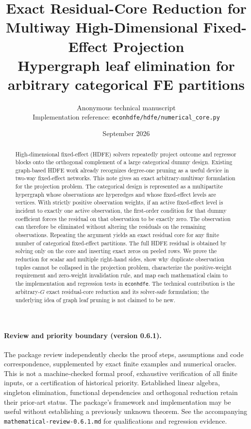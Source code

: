 \documentclass[11pt]{article}
\title{\textbf{Exact Residual-Core Reduction for Multiway High-Dimensional Fixed-Effect Projection}\\
\large Hypergraph leaf elimination for arbitrary categorical FE partitions}
\author{Anonymous technical manuscript\\[2pt]\small Implementation reference: \texttt{econhdfe/hdfe/numerical\_core.py}}
\date{September 2026}
\theoremstyle{definition}
\newcommand{\1}{\mathbf{1}}
\begin{document}
\maketitle

\begin{abstract}
High-dimensional fixed-effect (HDFE) solvers repeatedly project outcome and regressor blocks onto the orthogonal complement of a large categorical dummy design. Existing graph-based HDFE work already recognizes degree-one pruning as a useful device in two-way fixed-effect networks. This note gives an exact arbitrary-multiway formulation for the projection problem. The categorical design is represented as a multipartite hypergraph whose observations are hyperedges and whose fixed-effect levels are vertices. With strictly positive observation weights, if an active fixed-effect level is incident to exactly one active observation, the first-order condition for that dummy coefficient forces the residual on that observation to be exactly zero. The observation can therefore be eliminated without altering the residuals on the remaining observations. Repeating the argument yields an exact residual core for any finite number of categorical fixed-effect partitions. The full HDFE residual is obtained by solving only on the core and inserting exact zeros on peeled rows. We prove the reduction for scalar and multiple right-hand sides, show why duplicate observation tuples cannot be collapsed in the projection problem, characterize the positive-weight requirement and zero-weight invalidation rule, and map each mathematical claim to the implementation and regression tests in \texttt{econhdfe}. The technical contribution is the arbitrary-$G$ exact residual-core reduction and its solver-safe formulation; the underlying idea of graph leaf pruning is not claimed to be new.
\end{abstract}

\paragraph{Review and priority boundary (version 0.6.1).}
The package review independently checks the proof steps, assumptions and code
correspondence, supplemented by exact finite examples and numerical oracles.
This is not a machine-checked formal proof, exhaustive verification of all finite
inputs, or a certification of historical priority. Established linear algebra,
singleton elimination, functional dependencies and orthogonal reduction retain
their prior-art status. The package's framework and implementation may be useful
without establishing a previously unknown theorem. See the accompanying
\texttt{mathematical-review-0.6.1.md} for qualifications and regression evidence.
\end{document}
